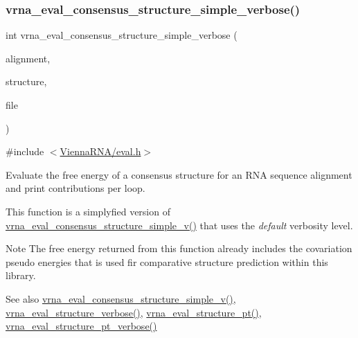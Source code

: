 \subsubsection{\texorpdfstring{vrna\+\_\+eval\+\_\+consensus\+\_\+structure\+\_\+simple\+\_\+verbose()}{vrna\_eval\_consensus\_structure\_simple\_verbose()}}
{\footnotesize\ttfamily int vrna\+\_\+eval\+\_\+consensus\+\_\+structure\+\_\+simple\+\_\+verbose (\begin{DoxyParamCaption}\item[{const char $\ast$$\ast$}]{alignment,  }\item[{const char $\ast$}]{structure,  }\item[{F\+I\+LE $\ast$}]{file }\end{DoxyParamCaption})}



{\ttfamily \#include $<$\mbox{\hyperlink{eval_8h}{Vienna\+R\+N\+A/eval.\+h}}$>$}



Evaluate the free energy of a consensus structure for an R\+NA sequence alignment and print contributions per loop. 

This function is a simplyfied version of \mbox{\hyperlink{group__eval_gad88927c62ab0a8b534e078e44be1b36e}{vrna\+\_\+eval\+\_\+consensus\+\_\+structure\+\_\+simple\+\_\+v()}} that uses the {\itshape default} verbosity level.

\begin{DoxyNote}{Note}
The free energy returned from this function already includes the covariation pseudo energies that is used fir comparative structure prediction within this library.
\end{DoxyNote}
\begin{DoxySeeAlso}{See also}
\mbox{\hyperlink{group__eval_gad88927c62ab0a8b534e078e44be1b36e}{vrna\+\_\+eval\+\_\+consensus\+\_\+structure\+\_\+simple\+\_\+v()}}, \mbox{\hyperlink{group__eval_ga0928d699d310178f84ee2351034e5cb5}{vrna\+\_\+eval\+\_\+structure\+\_\+verbose()}}, \mbox{\hyperlink{group__eval_gadbd09372ddfd7a450bbd590c96a6bfe4}{vrna\+\_\+eval\+\_\+structure\+\_\+pt()}}, \mbox{\hyperlink{group__eval_ga8a517cfeeae8c376ae7b1e0c401d38b4}{vrna\+\_\+eval\+\_\+structure\+\_\+pt\+\_\+verbose()}}
\end{DoxySeeAlso}

